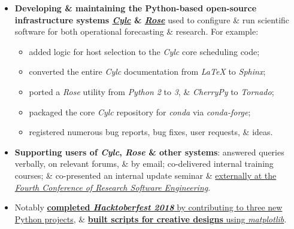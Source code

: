 \documentclass[10pt,a4paper,hidelinks]{protocol}
\begin{document}
\begin{itemize}
	\item \textbf{Developing \& maintaining the Python-based open-source infrastructure systems \href{https://github.com/cylc}{\textit{Cylc}} \& \href{https://github.com/metomi/rose}{\textit{Rose}}} used to configure \& run scientific software for both operational forecasting \& research. For example:
	\begin{itemize}
	  \itemsep0em
	  \item added logic for host selection to the \textit{Cylc} core scheduling code;
	  \item converted the entire \textit{Cylc} documentation from \textit{LaTeX} to \textit{Sphinx};
	  \item ported a \textit{Rose} utility from \textit{Python 2} to \textit{3}, \& \textit{CherryPy} to \textit{Tornado};
	  \item packaged the core \textit{Cylc} repository for \textit{conda} via \textit{conda-forge};
	  \item registered numerous bug reports, bug fixes, user requests, \& ideas.
	\end{itemize}
	\item \textbf{Supporting users of \textit{Cylc}, \textit{Rose} \& other systems}: answered queries verbally, on relevant forums, \& by email; co-delivered internal training courses; \& co-presented an internal update seminar \& \href{https://rseconuk2019.sched.com/event/QSSI/5d2-hpc-pursuing-and-supporting-reproducible-workflows-for-all-with-cylc}{externally at the \textit{Fourth Conference of Research Software Engineering}}.
\end{itemize}
\divider
{}
\begin{itemize}
	\item Notably \href{https://github.com/sadielbartholomew?tab=overview&from=2018-10-01&to=2018-10-31}{\textbf{completed \textit{Hacktoberfest 2018}} by contributing to three new Python projects}, \& \href{https://github.com/sadielbartholomew/creative-mini-projects}{\textbf{built scripts for creative designs} using \textit{matplotlib}}.
\end{itemize}
\end{document}
